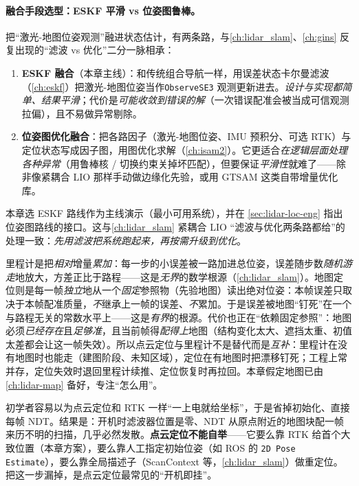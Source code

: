 \paragraph{融合手段选型：ESKF 平滑 vs 位姿图鲁棒。}
把“激光-地图位姿观测”融进状态估计，有两条路，与\cref{ch:lidar_slam}、\cref{ch:gins} 反复出现的“滤波 vs 优化”二分一脉相承：
\begin{enumerate}
  \item \textbf{ESKF 融合}（本章主线）：和传统组合导航一样，用误差状态卡尔曼滤波（\cref{ch:eskf}）把激光-地图位姿当作\texttt{ObserveSE3} 观测更新进去。\emph{设计与实现都简单、结果平滑}；代价是\emph{可能收敛到错误的解}（一次错误配准会被当成可信观测拉偏），且不易做异常剔除。
  \item \textbf{位姿图优化融合}：把各路因子（激光-地图位姿、IMU 预积分、可选 RTK）与定位状态写成因子图，用图优化求解（\cref{ch:isam2}）。它更适合\emph{在逻辑层面处理各种异常}（用鲁棒核 / 切换约束关掉坏匹配），但要保证\emph{平滑性}就难了——除非像紧耦合 LIO 那样手动做边缘化先验，或用 GTSAM 这类自带增量优化库。
\end{enumerate}
本章选 ESKF 路线作为主线演示（最小可用系统），并在 \cref{sec:lidar-loc-eng} 指出位姿图路线的接口。这与\cref{ch:lidar_slam} 紧耦合 LIO “滤波与优化两条路都给”的处理一致：\emph{先用滤波把系统跑起来，再按需升级到优化}。

\begin{insight}\label{ins:lidar-loc-bounded}
里程计是把\emph{相对}增量\emph{累加}：每一步的小误差被一路加进总位姿，误差随步数\emph{随机游走}地放大，方差正比于路程——这是\emph{无界}的数学根源（\cref{ch:lidar_slam}）。地图定位则是每一帧\emph{独立}地从一个\emph{固定}参照物（先验地图）读出绝对位姿：本帧误差只取决于本帧配准质量，\emph{不}继承上一帧的误差、\emph{不}累加。于是误差被地图“钉死”在一个与路程无关的常数水平上——这是\emph{有界}的根源。代价也正在“依赖固定参照”：地图必须\emph{已经存在}且\emph{足够准}，且当前帧得\emph{配得上}地图（结构变化太大、遮挡太重、初值太差都会让这一帧失效）。所以点云定位与里程计不是替代而是\emph{互补}：里程计在没有地图时也能走（建图阶段、未知区域），定位在有地图时把漂移钉死；工程上常并存，定位失效时退回里程计续推、定位恢复时再拉回。本章假定地图已由 \cref{ch:lidar-map} 备好，专注“怎么用”。
\end{insight}

\begin{pitfall}
初学者容易以为点云定位和 RTK 一样“一上电就给坐标”，于是省掉初始化、直接每帧 NDT。结果是：开机时滤波器位置是零、NDT 从原点附近的地图块配一帧来历不明的扫描，几乎必然发散。\textbf{点云定位不能自举}——它要么靠 RTK 给首个大致位置（本章方案），要么靠人工指定初始位姿（如 ROS 的 \texttt{2D Pose Estimate}），要么靠全局描述子（ScanContext 等，\cref{ch:lidar_slam}）做重定位。把这一步漏掉，是点云定位最常见的“开机即挂”。
\end{pitfall}


